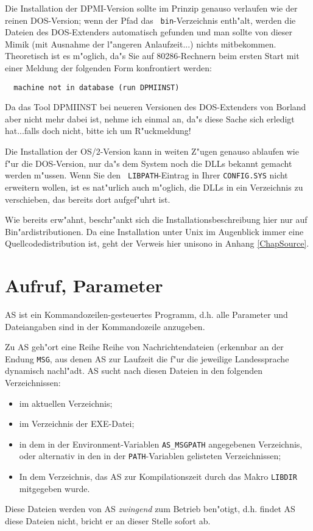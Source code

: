 \documentclass[12pt,a4paper,twoside]{report}
\begin{document}
Die Installation der DPMI-Version  sollte im Prinzip
genauso verlaufen wie der reinen DOS-Version; wenn der Pfad das {\tt
bin}-Verzeichnis enth"alt, werden die Dateien des DOS-Extenders
automatisch gefunden und man sollte von dieser Mimik (mit Ausnahme der
l"angeren Anlaufzeit...) nichts mitbekommen.  Theoretisch ist es m"oglich,
da"s Sie auf 80286-Rechnern beim ersten Start mit einer Meldung der
folgenden Form konfrontiert werden:
\begin{verbatim}
  machine not in database (run DPMIINST)
\end{verbatim}
Da das Tool DPMIINST bei neueren Versionen des DOS-Extenders von Borland
aber nicht mehr dabei ist, nehme ich einmal an, da"s diese Sache sich
erledigt hat...falls doch nicht, bitte ich um R"uckmeldung!

Die Installation der OS/2-Version  kann in weiten
Z"ugen genauso ablaufen wie f"ur die DOS-Version, nur da"s dem System noch
die DLLs bekannt gemacht werden m"ussen.  Wenn Sie den {\tt
LIBPATH}-Eintrag in Ihrer {\tt CONFIG.SYS} nicht erweitern wollen, ist es
nat"urlich auch m"oglich, die DLLs in ein Verzeichnis zu verschieben, das
bereits dort aufgef"uhrt ist.

Wie bereits erw"ahnt, beschr"ankt sich die Installationsbeschreibung hier
nur auf Bin"ardistributionen.  Da eine Installation unter Unix
 im Augenblick immer eine Quellcodedistribution ist,
geht der Verweis hier unisono in Anhang \ref{ChapSource}.


\section{Aufruf, Parameter}\label{SectCallConvention}

AS ist ein Kommandozeilen-gesteuertes Programm, d.h. alle Parameter
und Dateiangaben sind in der Kommandozeile anzugeben.

Zu AS geh"ort eine Reihe Reihe von Nachrichtendateien (erkennbar an der
Endung {\tt MSG}, aus denen AS zur Laufzeit die f"ur die jeweilige
Landessprache dynamisch nachl"adt.  AS sucht nach diesen Dateien in den
folgenden Verzeichnissen:
\begin{itemize}
\item{im aktuellen Verzeichnis;}
\item{im Verzeichnis der EXE-Datei;}
\item{in dem in der Environment-Variablen {\tt AS\_MSGPATH} angegebenen
      Verzeichnis, oder alternativ in den in der {\tt PATH}-Variablen
      gelisteten Verzeichnissen;}
\item{In dem Verzeichnis, das AS zur Kompilationszeit durch das
      Makro {\tt LIBDIR} mitgegeben wurde.}
\end{itemize}
Diese Dateien werden von AS {\em zwingend} zum Betrieb ben"otigt, d.h.
findet AS diese Dateien nicht, bricht er an dieser Stelle sofort ab.
\end{document}
